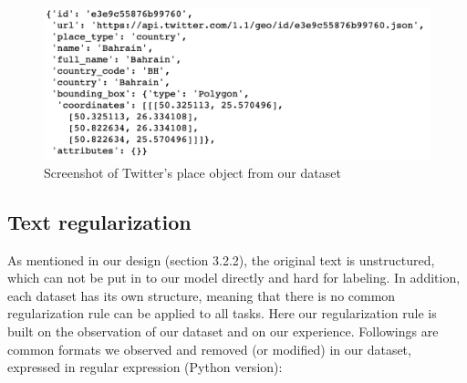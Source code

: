 \begin{figure}[!htbp]
    \centering
    \includegraphics[width=5in]{images/twitter_place.png}
    \caption{Screenshot of Twitter's place object from our dataset}
    \label{fig:twitter_place}
\end{figure}

\subsection{Text regularization}
As mentioned in our design (section 3.2.2), the original text is unstructured, which can not be put in to our model directly and hard for labeling. In addition, each dataset has its own structure, meaning that there is no common regularization rule can be applied to all tasks. Here our regularization rule is built on the observation of our dataset and on our experience. Followings are common formats we observed and removed (or modified) in our dataset, expressed in regular expression (Python version):
